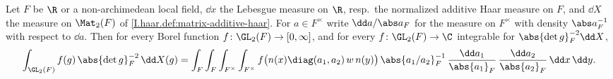 Let $F$ be $\R$ or a non-archimedean local field, $\dd x$ the Lebesgue measure on $\R$, resp.\ the normalized additive Haar measure
on $F$, and $\dd X$ the measure on $\Mat_2(F)$ of \cref{I.haar.def:matrix-additive-haar}. For $a\in F^\times$ write $\dd a/\abs a_F$ for the
measure on $F^\times$ with density $\abs a_F^{-1}$ with respect to $\dd a$. Then for every Borel function $f\colon\GL_2(F)\to[0,\infty]$, and for
every $f\colon\GL_2(F)\to\C$ integrable for $\abs{\det g}_F^{-2}\dd X$,
\[
  \int_{\GL_2(F)}f(g)\,\abs{\det g}_F^{-2}\,\dd X(g)
  =\int_F\int_F\int_{F^\times}\int_{F^\times}f\bigl(n(x)\diag(a_1,a_2)\,w\,n(y)\bigr)\,\abs{a_1/a_2}_F^{-1}\,
   \frac{\dd a_1}{\abs{a_1}_F}\,\frac{\dd a_2}{\abs{a_2}_F}\,\dd x\,\dd y .
\]
